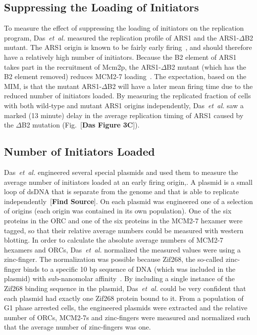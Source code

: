 {		
		\subsection{Suppressing the Loading of Initiators}
		\label{subsec:SuppressingInitiators}
		
		To measure the effect of suppressing the loading of initiators on the replication program, Das~\emph{et~al.} measured the replication profile of ARS1 and the ARS1-$\Delta$B2 mutant.
		The ARS1 origin is known to be fairly early firing~\cite{OriDB}, and should therefore have a relatively high number of initiators.
		Because the B2 element of ARS1 takes part in the recruitment of Mcm2p, the ARS1-$\Delta$B2 mutant (which has the B2 element removed) reduces MCM2-7 loading~\cite{ARS1Mutant}.
		The expectation, based on the MIM, is that the mutant ARS1-$\Delta$B2 will have a later mean firing time due to the reduced number of initiators loaded.
		By measuring the replicated fraction of cells with both wild-type and mutant ARS1 origins independently, Das~\emph{et~al.} saw a marked (13 minute) delay in the average replication timing of ARS1 caused by the $\Delta$B2 mutation (Fig.~[\textbf{Das Figure 3C}]).
		
		
		\subsection{Number of Initiators Loaded}
		\label{subsec:NoInitiatorsLoaded}
		
		Das~\emph{et~al.} engineered several special plasmids and used them to measure the average number of initiators loaded at an early firing origin,.
		A plasmid is a small loop of dsDNA that is separate from the genome and that is able to replicate independently~[\textbf{Find Source}].
		On each plasmid was engineered one of a selection of origins (each origin was contained in its own population).
		One of the six proteins in the ORC and one of the six proteins in the MCM2-7 hexamer were tagged, so that their relative average numbers could be measured with western blotting.
		In order to calculate the absolute average numbers of MCM2-7 hexamers and ORCs, Das~\emph{et~al.} normalized the measured values were using a zinc-finger.
		The normalization was possible because Zif268, the so-called zinc-finger binds to a specific 10 bp sequence of DNA (which was included in the plasmid) with sub-nanomolar affinity~\cite{ZincFingers}.
		By including a single instance of the Zif268 binding sequence in the plasmid, Das~\emph{et~al.} could be very confident that each plasmid had exactly one Zif268 protein bound to it.
		From a population of G1 phase arrested cells, the engineered plasmids were extracted and the relative number of ORCs, MCM2-7s and zinc-fingers were measured and normalized such that the average number of zinc-fingers was one.
		
}
